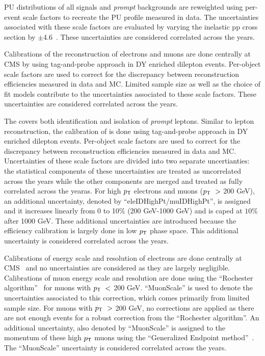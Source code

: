 \ac{PU} distributions of all signals and \emph{prompt} backgrounds are reweighted using per-event scale factors to recreate the \ac{PU} profile measured in data. The uncertainties associated with these scale factors are evaluated by varying the inelastic pp cross section by $\pm$4.6~\cite{Sirunyan:2018nqx}. These uncertainties are considered correlated across the years.

Calibrations of the reconstruction of electrons and muons are done centrally at \ac{CMS} by using tag-and-probe approach in DY enriched dilepton events. Per-object scale factors are used to correct for the discrepancy between reconstruction efficiencies measured in data and \ac{MC}. Limited sample size as well as the choice of fit models contribute to the uncertainties associated to these scale factors. These uncertainties are considered correlated across the years.

The \TOP covers both identification and isolation of \emph{prompt} leptons. Similar to lepton reconstruction, the calibration of \TOP is done using tag-and-probe approach in DY enriched dilepton events. Per-object scale factors are used to correct for the discrepancy between reconstruction efficiencies measured in data and \ac{MC}. Uncertainties of these scale factors are divided into two separate uncertianties: the statistical components of these uncertainties are treated as uncorrelated across the years while the other components are merged and treated as fully correlated across the yearas. For high $p_{\textsf{T}}$ electrons and muons ($p_{\textsf{T}}~>$ 200 GeV), an additional uncertainty, denoted by ``eleIDHighPt/muIDHighPt'', is assigned and it increases linearly from 0 to 10$\%$ (200 GeV-1000 GeV) and is caped at $10\%$ after 1000 GeV. These additional uncertainties are introduced because the efficiency calibration is largely done in low $p_{\textsf{T}}$ phase space. This additional uncertainty is considered correlated across the years.

Calibrations of energy scale and resolution of electrons are done centrally at CMS~\cite{CMS:2013lxn} and no uncertainties are considered as they are largely negligible. Calibrations of muon energy scale and resolution  are done using the ``Rochester algorithm''~\cite{Bodek:2012id} for muons with $p_{\textsf{T}}~<$ 200 GeV. ``MuonScale'' is used to denote the uncertainties associated to this correction, which comes primarily from limited sample size. For muons with $p_{\textsf{T}}~>$ 200 GeV, no corrections are applied as there are not enough events for a robust correction from the ``Rochester algorithm''. An additional uncertainty, also denoted by ``MuonScale'' is assigned to the momentum of these high $p_{\textsf{T}}$ muons using the ``Generalized Endpoint method''~\cite{CMS:2018rym}. The ``MuonScale'' uncertainty is considered correlated across the years.

